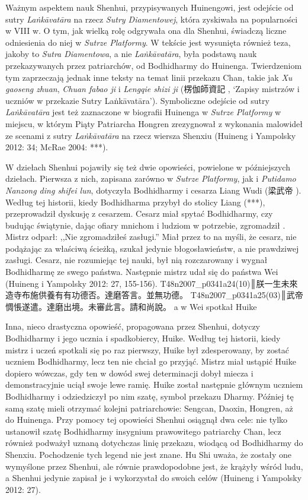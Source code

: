 Ważnym aspektem nauk Shenhui, przypisywanych Huinengowi, jest odejście od sutry \textit{La\.nkā\-vatāra} na rzecz \textit{Sutry Diamentowej}, która zyskiwała na popularności w VIII w.
O tym, jak wielką rolę odgrywała ona dla Shenhui, świadczą liczne odniesienia do niej w \textit{Sutrze Platformy}.
W tekście jest wysunięta również teza, jakoby to \textit{Sutra Diamentowa}, a nie \textit{La\.nkāvatāra}, była podstawą nauk przekazywanych przez patriarchów, od Bodhidharmy do Huinenga.
Twierdzeniom tym zaprzeczają jednak inne teksty na temat linii przekazu Chan, takie jak \textit{Xu gaoseng zhuan}, \textit{Chuan fabao ji} i \textit{Lengqie shizi ji} (楞伽師資記 , `Zapisy mistrzów i uczniów w przekazie Sutry La\.nkāvatāra').
Symboliczne odejście od sutry \textit{La\.nkāvatāra} jest też zaznaczone w biografii Huinenga w \textit{Sutrze Platformy} w miejscu, w którym Piąty Patriarcha Hongren zrezygnował z wykonania malowideł ze scenami z sutry \textit{La\.nkāvatāra} na rzecz wiersza Shenxiu (Huineng i Yampolsky 2012: 34; McRae 2004: ***).

W dziełach Shenhui pojawiły się też dwie opowieści, powielone w późniejszych dziełach. Pierwsza z nich, zapisana zarówno w \textit{Sutrze Platformy}, jak i \textit{Putidamo Nanzong ding shifei lun}, dotyczyła Bodhidharmy i cesarza Liang Wudi (梁武帝 ).
Według tej historii, kiedy Bodhidharma przybył do stolicy Liang (***), przeprowadził dyskusję z cesarzem. Cesarz miał spytać Bodhidharmy, czy budując świątynie, dając ofiary mnichom i ludziom w potrzebie, zgromadził .
Mistrz odparł: ,,Nie zgromadziłeś zasługi.'' Miał przez to na myśli, że cesarz, nie podążając za właściwą ścieżką, szukał jedynie błogosławieństw, a nie prawdziwej zasługi. Cesarz, nie rozumiejąc tej nauki, był nią rozczarowany i wygnał Bodhidharmę ze swego państwa. Następnie mistrz udał się do państwa Wei (Huineng i Yampolsky 2012: 27, 155-156).
T48n2007_p0341a24(10)║朕一生未來造寺布施供養有有功德否。達磨答言。並無功德。
T48n2007_p0341a25(03)║武帝惆悵遂遣。達磨出境。未審此言。請和尚說。
a w Wei spotkał Huike
\fi

Inna, nieco drastyczna opowieść, propagowana przez Shenhui, dotyczy Bodhidharmy i jego ucznia i spadkobiercy, Huike. Według tej historii, kiedy mistrz i uczeń spotkali się po raz pierwszy, Huike był zdesperowany, by zostać uczniem Bodhidharmy, lecz ten nie chciał go przyjąć. Mistrz miał ustąpić Huike dopiero wówczas, gdy ten w dowód swej determinacji dobył miecza i demonstracyjnie uciął swoje lewe ramię. Huike został następnie głównym uczniem Bodhidharmy i odziedziczył po nim szatę, symbol przekazu Dharmy. Później tę samą szatę mieli otrzymać kolejni patriarchowie: Sengcan, Daoxin, Hongren, aż do Huinenga. Przy pomocy tej opowieści Shenhui osiągnął dwa cele: nie tylko ustanowił szatę Bodhidharmy insygnium prawowitego patriarchy Chan, lecz również podważył uznaną dotychczas linię przekazu, wiodącą od Bodhidharmy do Shenxiu. Pochodzenie tych legend nie jest znane. Hu Shi uważa, że zostały one wymyślone przez Shenhui, ale równie prawdopodobne jest, że krążyły wśród ludu, a Shenhui jedynie zapisał je i wykorzystał do swoich celów (Huineng i Yampolsky 2012: 27).

